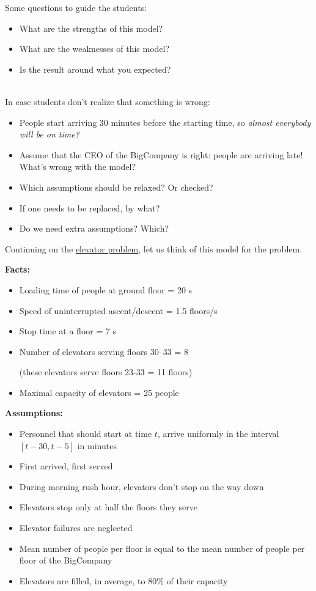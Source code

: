 \begin{annotation}
\begin{notes}
	Some questions to guide the students:
	\begin{itemize}
		\item What are the strengths of this model?
		\item What are the weaknesses of this model?
		\item Is the result around what you expected?
	\end{itemize}	
	
	\hfill \\
	In case students don't realize that something is wrong:
	\begin{itemize}
		\item People start arriving 30 minutes before the starting time, so \emph{almost everybody will be on time?}
		\item Assume that the CEO of the BigCompany is right: people are arriving late! What's wrong with the model?
	
		\item Which assumptions should be relaxed? Or checked?
		\item If one needs to be replaced, by what?
		\item Do we need extra assumptions? Which?
	\end{itemize}
\end{notes}
\end{annotation}
\question

Continuing on the \hyperref[elevator-model]{elevator problem}, let us think of this model for the problem.

\textbf{Facts:}
\begin{itemize}
	\item Loading time of people at ground floor = 20 s
	\item Speed of uninterrupted ascent/descent = 1.5 floors/s
	\item Stop time at a floor = 7 s
	\item Number of elevators serving floors 30--33 = 8

	(these elevators serve floors 23-33 = 11 floors)
	
	\item Maximal capacity of elevators = 25 people
\end{itemize}


\textbf{Assumptions:}
\begin{itemize}
	\item Personnel that should start at time $t$, arrive uniformly in the interval $[t-30, t-5]$ in minutes
	\item First arrived, first served
	\item During morning rush hour, elevators don't stop on the way down
	\item Elevators stop only at half the floors they serve
	\item Elevator failures are neglected
	\item Mean number of people per floor is equal to the mean number of people per floor of the BigCompany
	\item Elevators are filled, in average, to 80\% of their capacity
\end{itemize}

